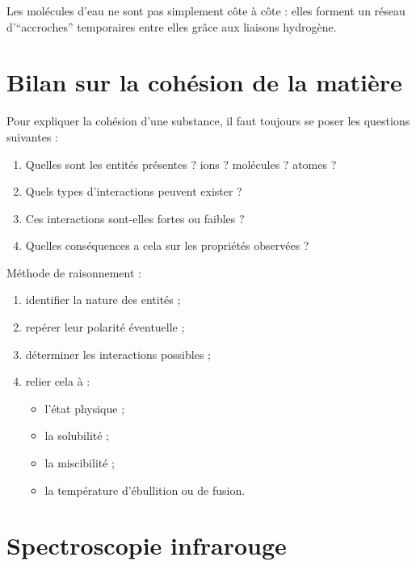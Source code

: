 \documentclass[11pt,a4paper]{article}
\begin{document}
\begin{analogebox}
Les molécules d’eau ne sont pas simplement côte à côte : elles forment un réseau d’``accroches'' temporaires entre elles grâce aux liaisons hydrogène.
\end{analogebox}

\section{Bilan sur la cohésion de la matière}

\begin{bilanbox}
Pour expliquer la cohésion d’une substance, il faut toujours se poser les questions suivantes :
\begin{enumerate}
    \item Quelles sont les entités présentes ?  
    ions ? molécules ? atomes ?
    \item Quels types d’interactions peuvent exister ?
    \item Ces interactions sont-elles fortes ou faibles ?
    \item Quelles conséquences a cela sur les propriétés observées ?
\end{enumerate}
\end{bilanbox}

\begin{methodebox}
Méthode de raisonnement :
\begin{enumerate}
    \item identifier la nature des entités ;
    \item repérer leur polarité éventuelle ;
    \item déterminer les interactions possibles ;
    \item relier cela à :
    \begin{itemize}
        \item l’état physique ;
        \item la solubilité ;
        \item la miscibilité ;
        \item la température d’ébullition ou de fusion.
    \end{itemize}
\end{enumerate}
\end{methodebox}

\section{Spectroscopie infrarouge}
\end{document}
